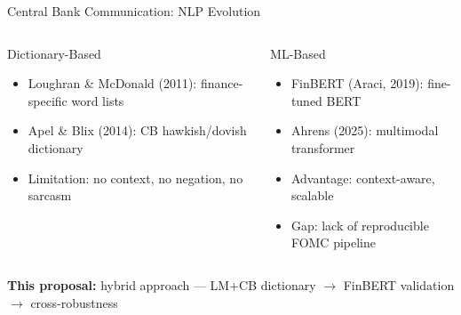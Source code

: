 \documentclass[aspectratio=169, 11pt]{beamer}
\begin{document}
\begin{frame}{Central Bank Communication: NLP Evolution}
  \begin{columns}[T]
    \begin{ablock}{Dictionary-Based}
      \begin{itemize}
        \item Loughran \& McDonald (2011): finance-specific word lists
        \item Apel \& Blix (2014): CB hawkish/dovish dictionary
        \item \alert{Limitation:} no context, no negation, no sarcasm
      \end{itemize}
    \end{ablock}

    \begin{aalertblock}{ML-Based}
      \begin{itemize}
        \item FinBERT (Araci, 2019): fine-tuned BERT
        \item Ahrens (2025): multimodal transformer
        \item \alert{Advantage:} context-aware, scalable
        \item \alert{Gap:} lack of reproducible FOMC pipeline
      \end{itemize}
    \end{aalertblock}
  \end{columns}

  \vspace{0.3em}
  \begin{center}
    \small \textbf{This proposal:} hybrid approach — LM+CB dictionary $\to$ FinBERT validation $\to$ cross-robustness
  \end{center}
\end{frame}
\end{document}
